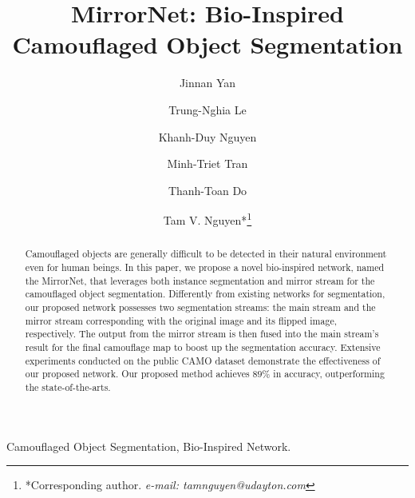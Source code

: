 \documentclass[journal]{IEEEtran}
\begin{document}
\title{MirrorNet: Bio-Inspired Camouflaged Object Segmentation}


\author[1]{Jinnan Yan}
\author[2]{Trung-Nghia Le}
\author[3, 4]{Khanh-Duy Nguyen}
\author[3, 6, 7]{Minh-Triet Tran}
\author[5]{Thanh-Toan Do}
\author[1]{Tam V. Nguyen*\thanks{*Corresponding author. {\it e-mail: tamnguyen@udayton.com}}}













\maketitle

\begin{abstract}
Camouflaged objects are generally difficult to be detected in their natural environment even for human beings. In this paper, we propose a novel bio-inspired network, named the MirrorNet, that leverages both instance segmentation and mirror stream for the camouflaged object segmentation. Differently from existing networks for segmentation, our proposed network possesses two segmentation streams: the main stream and the mirror stream corresponding with the original image and its flipped image, respectively. The output from the mirror stream is then fused into the main stream's result for the final camouflage map to boost up the segmentation accuracy. Extensive experiments conducted on the public CAMO dataset demonstrate the effectiveness of our proposed network. Our proposed method achieves $89\%$ in accuracy, outperforming the state-of-the-arts.
\end{abstract}

\begin{IEEEkeywords}
Camouflaged Object Segmentation, Bio-Inspired Network.
\end{IEEEkeywords}
\end{document}
